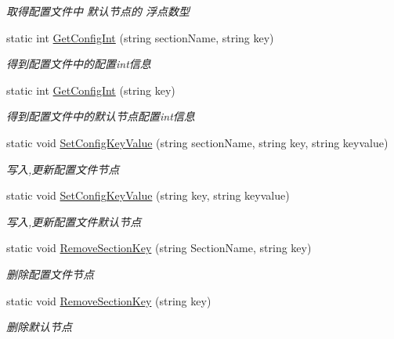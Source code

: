 \begin{DoxyCompactItemize}
\begin{DoxyCompactList}\small\item\em 取得配置文件中 默认节点的 浮点数型 \end{DoxyCompactList}\item 
static int \hyperlink{class_x_c_l_net_tools_1_1_x_m_l_1_1_config_class_ad425ce0eba3934ccc1d52ea684d2e0b8}{Get\-Config\-Int} (string section\-Name, string key)
\begin{DoxyCompactList}\small\item\em 得到配置文件中的配置int信息 \end{DoxyCompactList}\item 
static int \hyperlink{class_x_c_l_net_tools_1_1_x_m_l_1_1_config_class_a6324bda22efeeb66fa68217f6b4e6716}{Get\-Config\-Int} (string key)
\begin{DoxyCompactList}\small\item\em 得到配置文件中的默认节点配置int信息 \end{DoxyCompactList}\item 
static void \hyperlink{class_x_c_l_net_tools_1_1_x_m_l_1_1_config_class_a5d6a2482e702b6360c84003d98fae83d}{Set\-Config\-Key\-Value} (string section\-Name, string key, string keyvalue)
\begin{DoxyCompactList}\small\item\em 写入,更新配置文件节点 \end{DoxyCompactList}\item 
static void \hyperlink{class_x_c_l_net_tools_1_1_x_m_l_1_1_config_class_a993ce9110b05388e2d69044f65606f60}{Set\-Config\-Key\-Value} (string key, string keyvalue)
\begin{DoxyCompactList}\small\item\em 写入,更新配置文件默认节点 \end{DoxyCompactList}\item 
static void \hyperlink{class_x_c_l_net_tools_1_1_x_m_l_1_1_config_class_a6c39cd2a0133625d46b1e319aa1cdf92}{Remove\-Section\-Key} (string Section\-Name, string key)
\begin{DoxyCompactList}\small\item\em 删除配置文件节点 \end{DoxyCompactList}\item 
static void \hyperlink{class_x_c_l_net_tools_1_1_x_m_l_1_1_config_class_a0f5d67dc3b088f2efc9a9b1118134a0b}{Remove\-Section\-Key} (string key)
\begin{DoxyCompactList}\small\item\em 删除默认节点 \end{DoxyCompactList}\end{DoxyCompactItemize}


